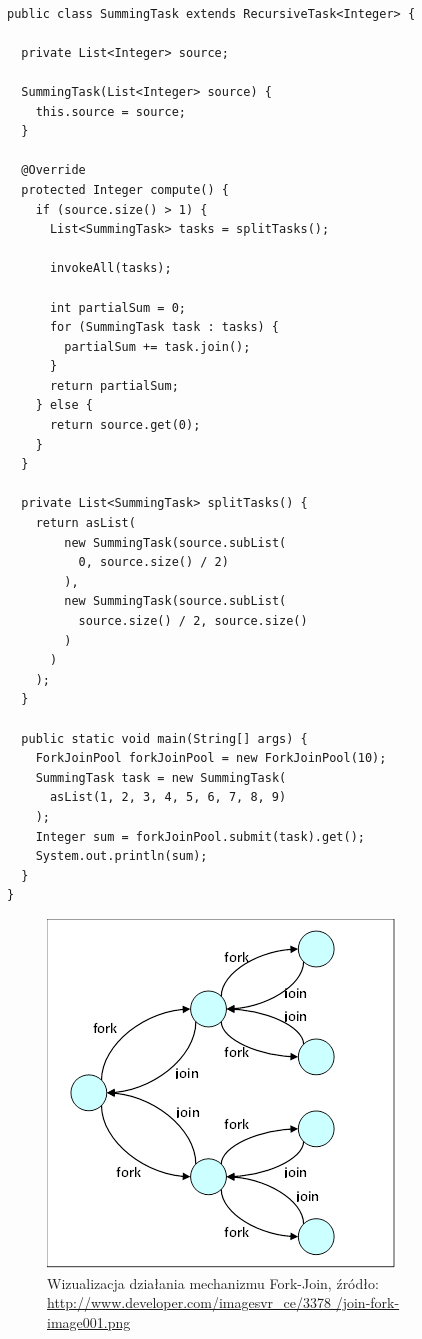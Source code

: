 \documentclass[12pt,twoside,openright]{extarticle}
\begin{document}
\begin{lstlisting}[label=fjpexample, caption=Przykładowe wykorzystanie FJP]

public class SummingTask extends RecursiveTask<Integer> {
  
  private List<Integer> source;
  
  SummingTask(List<Integer> source) {
    this.source = source;
  }
  
  @Override
  protected Integer compute() {
    if (source.size() > 1) {
      List<SummingTask> tasks = splitTasks();
      
      invokeAll(tasks);
      
      int partialSum = 0;
      for (SummingTask task : tasks) {
        partialSum += task.join();
      }
      return partialSum;
    } else {
      return source.get(0);
    }
  }
  
  private List<SummingTask> splitTasks() {
    return asList(
        new SummingTask(source.subList(
          0, source.size() / 2)
        ),
        new SummingTask(source.subList(
          source.size() / 2, source.size()
        )
      )
    );
  }
  
  public static void main(String[] args) {
    ForkJoinPool forkJoinPool = new ForkJoinPool(10);
    SummingTask task = new SummingTask(
      asList(1, 2, 3, 4, 5, 6, 7, 8, 9)
    );
    Integer sum = forkJoinPool.submit(task).get();
    System.out.println(sum);
  }
}

\end{lstlisting}

\begin{figure}[h]
\centering
\includegraphics{forkjoin.png}
    \caption{Wizualizacja działania mechanizmu Fork-Join, źródło: \url{http://www.developer.com/imagesvr\_ce/3378 /join-fork-image001.png}}
\label{fig:forkjoin}
\end{figure}
\end{document}
